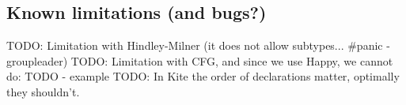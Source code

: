 

\subsection{Known limitations (and bugs?)}
TODO: Limitation with Hindley-Milner (it does not allow subtypes... \#panic - groupleader)
TODO: Limitation with CFG, and since we use Happy, we cannot do: TODO - example
TODO: In Kite the order of declarations matter, optimally they shouldn't.
